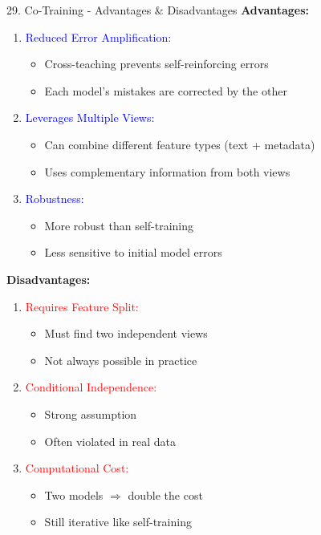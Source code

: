 \documentclass[8pt]{beamer}
\begin{document}
	\begin{frame}{29. Co-Training - Advantages \& Disadvantages}
		\fontsize{6.5}{7.5}\selectfont
		\textbf{Advantages:}
		
		\begin{enumerate}
			\item \textcolor{blue}{Reduced Error Amplification:}
			\begin{itemize}
				\item Cross-teaching prevents self-reinforcing errors
				\item Each model's mistakes are corrected by the other
			\end{itemize}
			
			\item \textcolor{blue}{Leverages Multiple Views:}
			\begin{itemize}
				\item Can combine different feature types (text + metadata)
				\item Uses complementary information from both views
			\end{itemize}
			
			\item \textcolor{blue}{Robustness:}
			\begin{itemize}
				\item More robust than self-training
				\item Less sensitive to initial model errors
			\end{itemize}
		\end{enumerate}
		
		\textbf{Disadvantages:}
		
		\begin{enumerate}
			\item \textcolor{red}{Requires Feature Split:}
			\begin{itemize}
				\item Must find two independent views
				\item Not always possible in practice
			\end{itemize}
			
			\item \textcolor{red}{Conditional Independence:}
			\begin{itemize}
				\item Strong assumption
				\item Often violated in real data
			\end{itemize}
			
			\item \textcolor{red}{Computational Cost:}
			\begin{itemize}
				\item Two models $\Rightarrow$ double the cost
				\item Still iterative like self-training
			\end{itemize}
		\end{enumerate}
	\end{frame}
	
\end{document}
